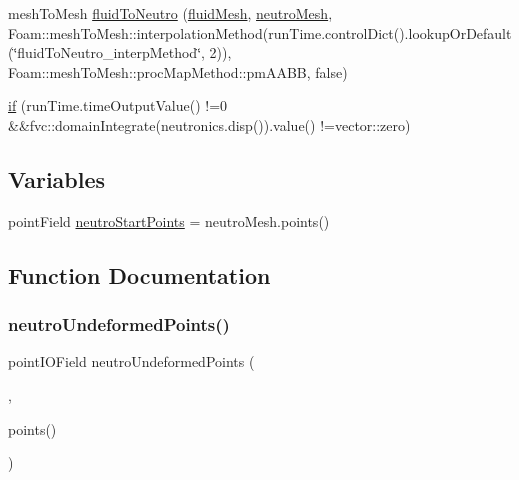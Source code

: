 \begin{DoxyCompactItemize}
\item 
mesh\+To\+Mesh \hyperlink{createMeshInterpolators_8H_a7e07a16eee8c48d8fe1dbdd97238623e}{fluid\+To\+Neutro} (\hyperlink{createFluidMesh_8H_abc811848be202e7a888cde0339e0dd40}{fluid\+Mesh}, \hyperlink{createNeutroMesh_8H_a5b79902f9ab3ed1763fd3355f92d1cc2}{neutro\+Mesh}, Foam\+::mesh\+To\+Mesh\+::interpolation\+Method(run\+Time.\+control\+Dict().lookup\+Or\+Default(\char`\"{}fluid\+To\+Neutro\+\_\+interp\+Method\char`\"{}, 2)), Foam\+::mesh\+To\+Mesh\+::proc\+Map\+Method\+::pm\+A\+A\+BB, false)
\item 
\hyperlink{createMeshInterpolators_8H_a8863e5779b943e5f487e3538650608c0}{if} (run\+Time.\+time\+Output\+Value() !=0 \&\&fvc\+::domain\+Integrate(neutronics.\+disp()).value() !=vector\+::zero)
\end{DoxyCompactItemize}
\subsection*{Variables}
\begin{DoxyCompactItemize}
\item 
point\+Field \hyperlink{createMeshInterpolators_8H_a1d4d2520178d051611528a1ae20c18cd}{neutro\+Start\+Points} = neutro\+Mesh.\+points()
\end{DoxyCompactItemize}


\subsection{Function Documentation}
\mbox{\label{createMeshInterpolators_8H_ae1e667a7209da7536e92efe526231ddb}} 
\subsubsection{\texorpdfstring{neutro\+Undeformed\+Points()}{neutroUndeformedPoints()}}
{\footnotesize\ttfamily point\+I\+O\+Field neutro\+Undeformed\+Points (\begin{DoxyParamCaption}\item[{I\+Oobject(\char`\"{}neutro\+Undeformed\+Points\char`\"{}, neutro\+Mesh.\+time().time\+Name(), \hyperlink{createNeutroMesh_8H_a5b79902f9ab3ed1763fd3355f92d1cc2}{neutro\+Mesh}, I\+Oobject\+::\+R\+E\+A\+D\+\_\+\+I\+F\+\_\+\+P\+R\+E\+S\+E\+NT,((multiphysics.\+solve\+Thermo\+Mechanics()) ? I\+Oobject\+::\+A\+U\+T\+O\+\_\+\+W\+R\+I\+TE \+:I\+Oobject\+::\+N\+O\+\_\+\+W\+R\+I\+TE))}]{,  }\item[{neutro\+Mesh.}]{points() }\end{DoxyParamCaption})}



